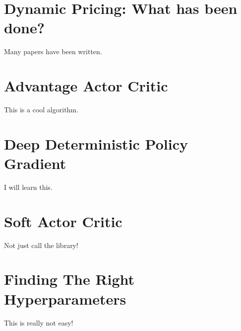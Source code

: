 \section{Dynamic Pricing: What has been done?}
Many papers have been written.

\section{Advantage Actor Critic}
This is a cool algorithm.

\section{Deep Deterministic Policy Gradient}
I will learn this.

\section{Soft Actor Critic}
Not just call the library!

\section{Finding The Right Hyperparameters}
This is really not easy!
